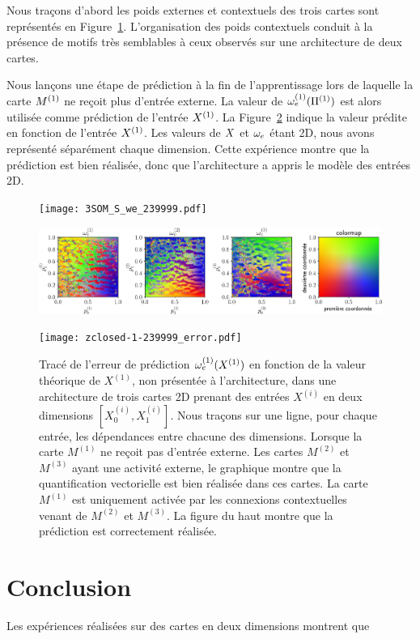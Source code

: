 \documentclass[../main]{subfiles}
\begin{document}
Nous traçons d'abord les poids externes et contextuels des trois cartes sont représentés en Figure~\ref{fig:3som_w}.
L'organisation des poids contextuels conduit à la présence de motifs très semblables à ceux observés sur une architecture de deux cartes.

Nous lançons une étape de prédiction à la fin de l'apprentissage lors de laquelle la carte $M^{({1})}$ ne reçoit plus d'entrée externe. 
La valeur de $\omega_{e}^{({1})}(\Pi^{({1})})$ est alors utilisée comme prédiction de l'entrée $X^{({1})}$.
La Figure~\ref{fig:3som_pred} indique la valeur prédite en fonction de l'entrée $X^{({1})}$. 
Les valeurs de $X$ et $\omega_e$ étant 2D, nous avons représenté séparément chaque dimension. Cette expérience montre que la prédiction est bien réalisée, donc que l'architecture a appris le modèle des entrées 2D.

\begin{figure}
	\begin{minipage}{\textwidth}
		\centering\texttt{[image: 3SOM\_S\_we\_239999.pdf]}
	\end{minipage}
	\begin{minipage}{\textwidth}
		\includegraphics[width=\textwidth]{3SOM_S_wc_239999.pdf}
		\caption{\label{fig:3som_w}}
	\end{minipage}
\end{figure}

\begin{figure}
\texttt{[image: zclosed-1-239999\_error.pdf]}
\caption{Tracé de l'erreur de prédiction $\omega_e^{({1})}(X^{({1})})$ en fonction de la valeur théorique de $X^{(1)}$, non présentée à l'architecture, dans une architecture de trois cartes 2D prenant des entrées $X^{(i)}$ en deux dimensions $[X^{(i)}_0, X^{(i)}_1]$. Nous traçons sur une ligne, pour chaque entrée, les dépendances entre chacune des dimensions.
Lorsque la carte $M^{(1)}$ ne reçoit pas d'entrée externe. Les cartes $M^{(2)}$ et $M^{(3)}$ ayant une activité externe, le graphique montre que la quantification vectorielle est bien réalisée dans ces cartes. La carte $M^{(1)}$ est uniquement activée par les connexions contextuelles venant de $M^{(2)}$ et $M^{(3)}$. La figure du haut montre que la prédiction est correctement réalisée.\label{fig:3som_pred}}
\end{figure}




\section{Conclusion}

Les expériences réalisées sur des cartes en deux dimensions montrent que 


\ifSubfilesClassLoaded{
    \printbibliography
}{}
\end{document}
